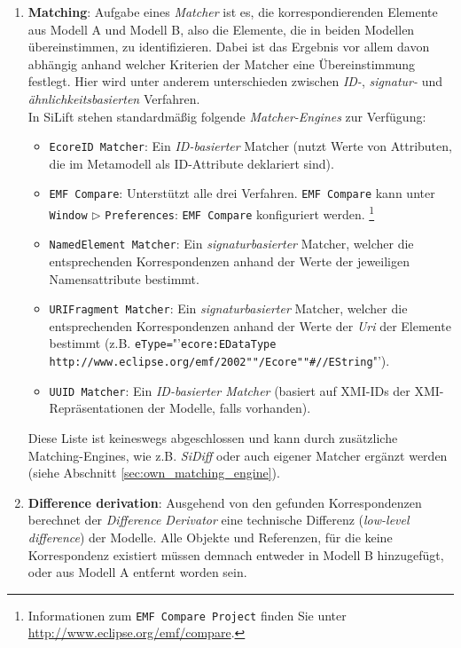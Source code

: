 \documentclass[a4paper]{scrartcl}
\begin{document}
\begin{enumerate}

\item \textbf{Matching}: 
Aufgabe eines \textit{Matcher} ist es, die korrespondierenden Elemente aus Modell A und Modell B, also die Elemente, die in beiden Modellen übereinstimmen, zu identifizieren.
Dabei ist das Ergebnis vor allem davon abhängig anhand welcher Kriterien der Matcher eine Übereinstimmung festlegt.
Hier wird unter anderem unterschieden zwischen \textit{ID-}, \textit{signatur-} und \textit{ähnlichkeitsbasierten} Verfahren.\\
In SiLift stehen standardmäßig folgende \textit{Matcher-Engines} zur Verfügung:

\begin{itemize}
	\item \texttt{EcoreID Matcher}: Ein \textit{ID-basierter} Matcher (nutzt Werte von Attributen, die im Metamodell als ID-Attribute deklariert sind).
	\item \texttt{EMF Compare}: 
	Unterstützt alle drei Verfahren. \texttt{EMF Compare} kann unter \texttt{Win\-dow} $\triangleright$ \texttt{Preferences}: \texttt{EMF Compare} konfiguriert werden. \footnote{Informationen zum \texttt{EMF Compare Project} finden Sie unter \url{http://www.eclipse.org/emf/compare}.}
	
	\item \texttt{NamedElement Matcher}: 
	Ein \textit{signaturbasierter} Matcher, welcher die ent\-sprech\-en\-den Korrespondenzen anhand der Werte der jeweiligen Namensattribute bestimmt.
	
	\item \texttt{URIFragment Matcher}: 
	Ein \textit{signaturbasierter} Matcher, welcher die ent\-sprech\-en\-den Korrespondenzen anhand der Werte der \textit{Uri} der Elemente bestimmt (z.B. \texttt{eType=}"'\texttt{ecore:EDataType http://www.eclipse.org/emf/2002""/Ecore""\#//EString}"').
	
	\item \texttt{UUID Matcher}: Ein \textit{ID-basierter Matcher} (basiert auf XMI-IDs der XMI-Repräsentationen der Modelle, falls vorhanden).
\end{itemize}

Diese Liste ist keineswegs abgeschlossen und kann durch zusätzliche Matching-Engines, wie z.B. \textit{SiDiff} oder auch eigener Matcher ergänzt werden (siehe Abschnitt \ref{sec:own_matching_engine}). \\

\item \textbf{Difference derivation}: 
Ausgehend von den gefunden Korrespondenzen berechnet der \textit{Difference Derivator} eine technische Differenz (\textit{low-level difference}) der Mo\-del\-le.
Alle Objekte und Referenzen, für die keine Korrespondenz existiert müssen demnach entweder in Modell B hinzugefügt, oder aus Modell A entfernt worden sein.


\end{enumerate}
\end{document}
